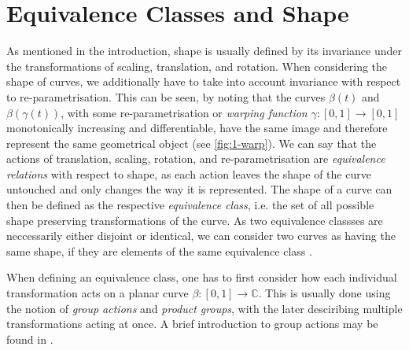 \section{Equivalence Classes and Shape}
\label{sec:2-shape}
As mentioned in the introduction, shape is usually defined by its invariance under the transformations of scaling, translation, and rotation.
When considering the shape of curves, we additionally have to take into account invariance with respect to re-parametrisation.
This can be seen, by noting that the curves $\beta(t)$ and $\beta(\gamma(t))$, with some re-parametrisation or \textit{warping function} $\gamma : [0,1] \rightarrow [0,1]$ monotonically increasing and differentiable, have the same image and therefore represent the same geometrical object (see \cref{fig:1-warp}).
We can say that the actions of translation, scaling, rotation, and re-parametrisation are \textit{equivalence relations} with respect to shape, as each action leaves the shape of the curve untouched and only changes the way it is represented.
The shape of a curve can then be defined as the respective \textit{equivalence class}, i.e. the set of all possible shape preserving transformations of the curve.
As two equivalence classses are neccessarily either disjoint or identical, we can consider two curves as having the same shape, if they are elements of the same equivalence class \parencite[see][40]{SrivastavaKlassen2016}.

When defining an equivalence class, one has to first consider how each individual transformation acts on a planar curve $\beta : [0,1] \rightarrow \mathbb{C}$.
This is usually done using the notion of \textit{group actions} and \textit{product groups}, with the later desciribing multiple transformations acting at once.
A brief introduction to group actions may be found in \cite[Chap.\ 3]{SrivastavaKlassen2016}.

